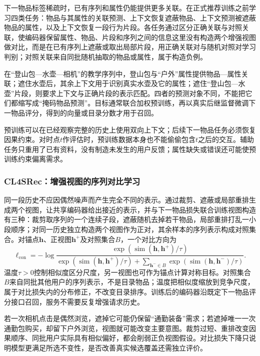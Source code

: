 下一物品标签稀疏时，已有序列和属性仍能提供更多关联。在正式推荐训练之前学习四类任务：物品与其属性的关联预测、上下文恢复遮蔽物品、上下文预测被遮蔽物品的属性，以及上下文恢复一段行为片段。各任务通过区分正确关联与对照关联，使编码器保留属性、物品、片段和序列之间的信息这里没有构造两个增强视图做对比，而是在已有序列上遮蔽或取出局部片段，用正确关联对与随机对照对学习判别；对照关联来自同批随机抽取的物品或属性，属于构造负例。

在“登山包—水壶—相机”的教学序列中，登山包与“户外”属性提供物品—属性关联；遮住水壶后，其余上下文用于识别真实水壶及它的属性；遮住“登山包—水壶”片段，则要求上下文与正确片段的表示匹配。四者的预测对象不同，不能把它们都缩写成“掩码物品预测”。目标通常联合加权预训练，再以真实后继监督微调下一物品评分，得到的向量或目录分数才用于召回。

预训练可以在已经观察完整的历史上使用双向上下文；后续下一物品任务必须恢复因果约束。对时点$t$作评估时，预训练数据本身也不能偷偷包含$t$之后的交互。辅助任务只重用了已有资料，没有制造未发生的用户反馈；属性缺失或错误还可能使预训练约束偏离需求。

\Needspace{75mm}
\subsubsection{CL4SRec：增强视图的序列对比学习}
\label{sec:rs-cl4srec}

同一段历史不应因偶然噪声而产生完全不同的表示。通过裁剪、遮蔽或局部重排生成两个视图，让共享编码器给出接近的表示，并与下一物品损失联合训练视图构造有三种：裁剪取序列的一个连续子段，遮蔽随机去掉若干物品，局部重排打乱一小段顺序；对同一历史独立构造两个视图作为正对，其余样本的序列表示构成对照集合。对锚点$\bm h$、正视图$\bm h^+$及对照集合$B$，一个对比方向为
\begin{equation}
 \ell_{\mathrm{con}}
 =-\log\frac{\exp(\operatorname{sim}(\bm h,\bm h^+)/\tau)}
 {\exp(\operatorname{sim}(\bm h,\bm h^+)/\tau)
    +\sum_{\bm h^-\in B}\exp(\operatorname{sim}(\bm h,\bm h^-)/\tau)}.
 \label{eq:rs-sequence-contrast}
\end{equation}
温度$\tau>0$控制相似度区分尺度，另一视图也可作为锚点计算对称目标。对照集合$B$来自同批其他用户的序列表示，不是目录物品；温度把相似度缩放到竞争尺度，属于对比损失内的分布修正，不改变目录排序。训练后的编码器沿既定下一物品评分接口召回，服务不需要反复增强请求历史。

若一次相机点击是偶然浏览，遮掉它可能仍保留“通勤装备”需求；若遮掉唯一一次通勤包购买，却留下户外浏览，视图就可能改变主要意图。裁剪过短、重排改变因果顺序、同批用户实际具有相似偏好，都会削弱正负视图假设。对比损失下降只说明模型更满足所选不变性，是否改善真实候选覆盖还需独立评价。

